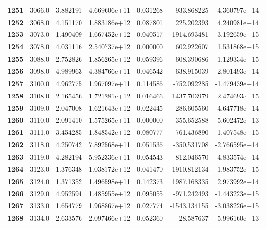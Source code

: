\documentclass{report}[12pt]
\begin{document}
\begin{center}
\begin{tabular}{lrrrrrr}
\textbf{1251} &         3066.0 &   3.882191 &  4.669606e+11 &    0.031268 &   933.868225 &  4.360797e+14 \\
\textbf{1252} &         3068.0 &   4.151170 &  1.883186e+12 &    0.087801 &   225.202393 &  4.240981e+14 \\
\textbf{1253} &         3073.0 &   1.490409 &  1.667452e+12 &    0.040517 &  1914.693481 &  3.192659e+15 \\
\textbf{1254} &         3078.0 &   4.031116 &  2.540737e+12 &    0.000000 &   602.922607 &  1.531868e+15 \\
\textbf{1255} &         3088.0 &   2.752826 &  1.856265e+12 &    0.059396 &   608.390686 &  1.129334e+15 \\
\textbf{1256} &         3098.0 &   4.989963 &  4.384766e+11 &    0.046542 &  -638.915039 & -2.801493e+14 \\
\textbf{1257} &         3100.0 &   4.962775 &  1.967097e+11 &    0.114586 &  -752.092285 & -1.479439e+14 \\
\textbf{1258} &         3108.0 &   2.165456 &  1.721281e+12 &    0.016466 &  1437.703979 &  2.474693e+15 \\
\textbf{1259} &         3109.0 &   2.047008 &  1.621643e+12 &    0.022445 &   286.605560 &  4.647718e+14 \\
\textbf{1260} &         3110.0 &   2.091410 &  1.575265e+11 &    0.000000 &   355.652588 &  5.602472e+13 \\
\textbf{1261} &         3111.0 &   3.454285 &  1.848542e+12 &    0.080777 &  -761.436890 & -1.407548e+15 \\
\textbf{1262} &         3118.0 &   4.250742 &  7.892568e+11 &    0.051536 &  -350.531708 & -2.766595e+14 \\
\textbf{1263} &         3119.0 &   4.282194 &  5.952336e+11 &    0.054543 &  -812.046570 & -4.833574e+14 \\
\textbf{1264} &         3123.0 &   1.376348 &  1.038172e+12 &    0.041470 &  1910.812134 &  1.983752e+15 \\
\textbf{1265} &         3124.0 &   1.371352 &  1.496598e+11 &    0.142373 &  1987.168335 &  2.973992e+14 \\
\textbf{1266} &         3129.0 &   4.952594 &  1.485955e+12 &    0.095055 &  -971.242493 & -1.443223e+15 \\
\textbf{1267} &         3133.0 &   1.654779 &  1.968867e+12 &    0.027774 & -1543.134155 & -3.038226e+15 \\
\textbf{1268} &         3134.0 &   2.633576 &  2.097466e+12 &    0.052360 &   -28.587637 & -5.996160e+13 \\

\end{tabular}
\end{center}
\end{document}
